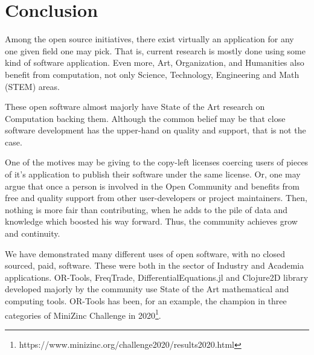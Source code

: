 \documentclass[
12pt,				%
openright,			%
oneside,			%
a4paper,			%
brazil,				%
english,			%
]{abntex2}
\begin{document}
\chapter{Conclusion}
Among the open source initiatives, there exist virtually an
application for any one given field one may pick. That is, current
research is mostly done using some kind of software application. Even
more, Art, Organization, and Humanities also benefit from computation,
not only Science, Technology, Engineering and Math (STEM) areas.

These open software almost majorly have State of the Art research on
Computation backing them. Although the common belief may be that close
software development has the upper-hand on quality and support, that
is not the case.

One of the motives may be giving to the copy-left
licenses coercing users of pieces of it's application to publish their
software under the same license. Or, one may argue that once a person
is involved in the Open Community and benefits from free and quality
support from other user-developers or project maintainers. Then,
nothing is more fair than contributing, when he adds to the pile of
data and knowledge which boosted his way forward. Thus, the community
achieves grow and continuity.

We have demonstrated many different uses of open software, with no
closed sourced, paid, software. These were both in the sector of
Industry and Academia applications. OR-Tools, FreqTrade, DifferentialEquations.jl and Clojure2D library developed majorly by the community use State of the Art mathematical and computing tools. OR-Tools has been, for an example, the champion in three categories of MiniZinc Challenge in 2020\footnote{https://www.minizinc.org/challenge2020/results2020.html}.
\end{document}
